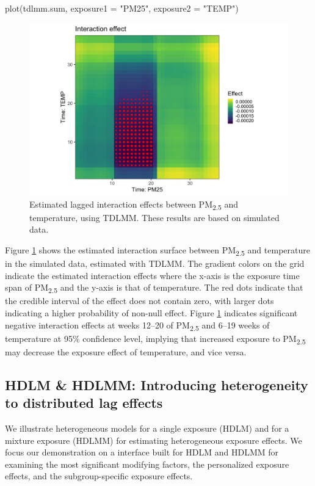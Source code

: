 \begin{example}
plot(tdlmm.sum, exposure1 = "PM25", exposure2 = "TEMP")
\end{example}
\begin{figure}[ht]
    \centering
    \includegraphics[width=120mm]{images/TDLMM_int.png}
    \caption{Estimated lagged interaction effects between PM\textsubscript{2.5} and temperature, using TDLMM. These results are based on simulated data.}
    \label{fig:tdlmm_int}
\end{figure}
Figure \ref{fig:tdlmm_int} shows the estimated interaction surface between PM\textsubscript{2.5} and temperature in the simulated data, estimated with TDLMM. The gradient colors on the grid indicate the estimated interaction effects where the x-axis is the exposure time span of PM\textsubscript{2.5} and the y-axis is that of temperature. The red dots indicate that the credible interval of the effect does not contain zero, with larger dots indicating a higher probability of non-null effect. Figure \ref{fig:tdlmm_int} indicates significant negative interaction effects at weeks 12--20 of PM\textsubscript{2.5} and 6--19 weeks of temperature at 95\% confidence level, implying that increased exposure to PM\textsubscript{2.5} may decrease the exposure effect of temperature, and vice versa.

\subsection{HDLM \& HDLMM: Introducing heterogeneity to distributed lag effects} \label{het_fit}
We illustrate heterogeneous models for a single exposure (HDLM) and for a mixture exposure (HDLMM) for estimating heterogeneous exposure effects. We focus our demonstration on a  interface built for HDLM and HDLMM for examining the most significant modifying factors, the personalized exposure effects, and the subgroup-specific exposure effects.

